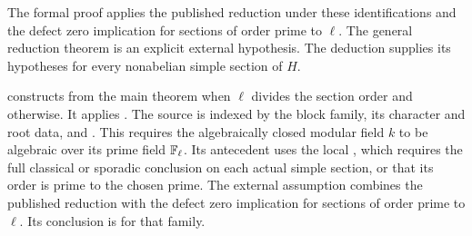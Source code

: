 The formal proof applies the published reduction under these
identifications and the defect zero implication for sections of
order prime to $\ell$. The general reduction theorem is an explicit
external hypothesis. The deduction supplies its hypotheses for every
nonabelian simple section of $H$.

\begin{implementation}
 constructs
 from the main theorem when
$\ell$ divides the section order and 
otherwise. It applies
.
The source is indexed by the block family, its character and root
data, and . This requires the algebraically
closed modular field $k$ to be algebraic over its prime field $\mathbb F_\ell$.
Its antecedent uses the local
, which requires the full classical or
sporadic conclusion on each actual simple section, or that its order is
prime to the chosen prime. The external assumption combines the published reduction with the
defect zero implication for sections of order prime to $\ell$.
Its conclusion is  for that family.
\end{implementation}
